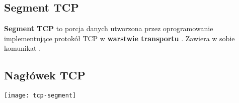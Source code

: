 \documentclass[../sk-egzamin.tex]{subfiles}
\begin{document}

\subsection*{Segment TCP}
\textbf{Segment TCP} to porcja danych utworzona przez oprogramowanie
implementujące protokół TCP w \textbf{warstwie transportu} .
Zawiera w sobie komunikat
.

\subsection*{Nagłówek TCP}

\begin{center}
\texttt{[image: tcp-segment]}
\end{center}
\end{document}
